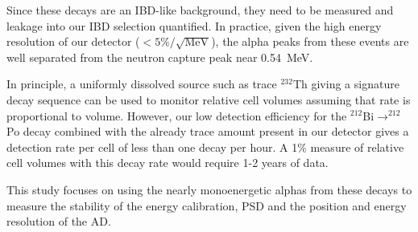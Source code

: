 Since these decays are an IBD-like background, they need to be measured and leakage into our IBD selection quantified. In practice, given the high energy resolution of our detector ($<5\%/\sqrt{\textrm{MeV}}$), the alpha peaks from these events are well separated from the neutron capture peak near 0.54~MeV.

In principle, a uniformly dissolved source such as trace $^{232}$Th giving a signature decay sequence can be used to monitor relative cell volumes assuming that rate is proportional to volume. However, our low detection efficiency for the $^{212}$Bi$\rightarrow^{212}$Po decay combined with the already trace amount present in our detector gives a detection rate per cell of less than one decay per hour. A 1\% measure of relative cell volumes with this decay rate would require 1-2 years of data.

This study focuses on using the nearly monoenergetic alphas from these decays to measure the stability of the energy calibration, PSD and the position and energy resolution of the AD. 

